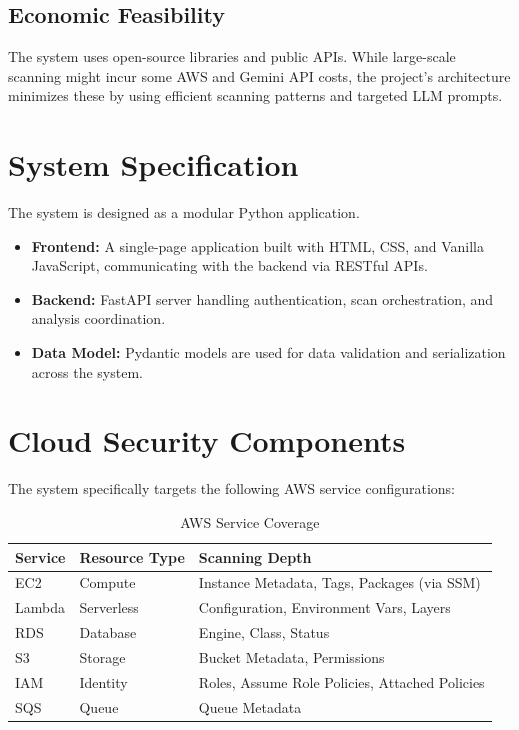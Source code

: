 \subsection{Economic Feasibility}
The system uses open-source libraries and public APIs. While large-scale scanning might incur some AWS and Gemini API costs, the project's architecture minimizes these by using efficient scanning patterns and targeted LLM prompts.

\section{System Specification}
The system is designed as a modular Python application. 
\begin{itemize}
    \item \textbf{Frontend:} A single-page application built with HTML, CSS, and Vanilla JavaScript, communicating with the backend via RESTful APIs.
    \item \textbf{Backend:} FastAPI server handling authentication, scan orchestration, and analysis coordination.
    \item \textbf{Data Model:} Pydantic models are used for data validation and serialization across the system.
\end{itemize}

\section{Cloud Security Components}
The system specifically targets the following AWS service configurations:
\begin{table}[h!]
	\centering
	\caption{AWS Service Coverage}
	\renewcommand{\arraystretch}{1.3}
	\begin{tabular}{|l|l|l|}
		\hline
		\textbf{Service} & \textbf{Resource Type} & \textbf{Scanning Depth} \\
		\hline
		EC2 & Compute & Instance Metadata, Tags, Packages (via SSM) \\
		Lambda & Serverless & Configuration, Environment Vars, Layers \\
		RDS & Database & Engine, Class, Status \\
		S3 & Storage & Bucket Metadata, Permissions \\
		IAM & Identity & Roles, Assume Role Policies, Attached Policies \\
		SQS & Queue & Queue Metadata \\
		\hline
	\end{tabular}
\end{table}

